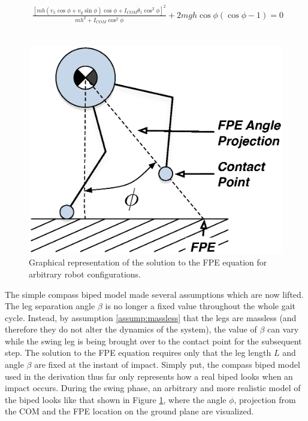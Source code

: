\begin{figure}[!t]
	\begin{equation} \label{eq:fpe}
	\begin{aligned}
		\frac{{{{\left[ {mh({v_x}\cos \phi  + {v_y}\sin \phi )\cos \phi  + {I_{COM}}{{\dot \theta }_1}{{\cos }^2}\phi } \right]}^2}}}{{m{h^2} + {I_{COM}}{{\cos }^2}\phi }} + 2mgh\cos \phi (\cos \phi  - 1) = 0
	\end{aligned}
	\end{equation}
	\\ 
	\hrulefill
\end{figure}


\begin{figure}[!b]
	\centering
    \includegraphics[scale=0.8]{fig/fpe/fpeangle.eps}
  	\caption{Graphical representation of the solution to the FPE equation for arbitrary robot configurations.}
	\label{fig:phi}
\end{figure}

The simple compass biped model made several assumptions which are now lifted. The leg separation angle $\beta$ is no longer a fixed value throughout the whole gait cycle. Instead, by assumption \ref{assump:massless} that the legs are massless (and therefore they do not alter the dynamics of the system), the value of $\beta$ can vary while the swing leg is being brought over to the contact point for the subsequent step. The solution to the FPE equation requires only that the leg length $L$ and angle $\beta$ are fixed at the instant of impact. Simply put, the compass biped model used in the derivation thus far only represents how a real biped looks when an impact occurs. During the swing phase, an arbitrary and more realistic model of the biped looks like that shown in Figure \ref{fig:phi}, where the angle $\phi$, projection from the COM and the FPE location on the ground plane are visualized. 

